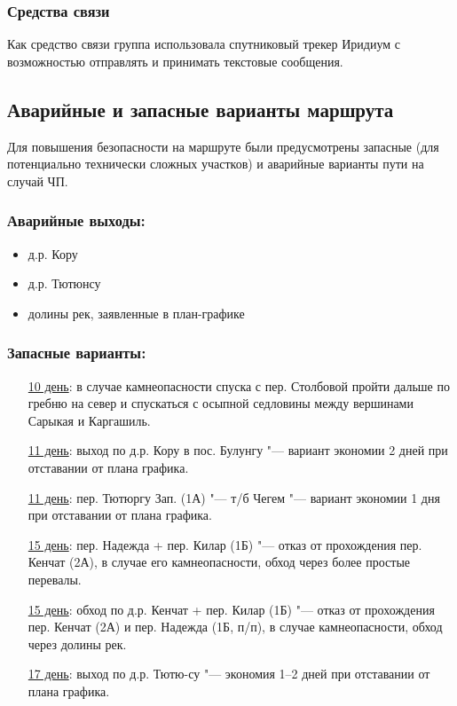 		\subsubsection{Средства связи}
			Как средство связи группа использовала спутниковый трекер Иридиум с возможностью отправлять и принимать текстовые сообщения. 

	\subsection{Аварийные и запасные варианты маршрута}
		Для повышения безопасности на маршруте были предусмотрены запасные (для потенциально технически сложных участков) и 
		аварийные варианты пути  на случай ЧП.

		\subsubsection*{Аварийные выходы:}
			\begin{itemize}
				\item д.р. Кору
				\item д.р. Тютюнсу
				\item долины рек, заявленные в план-графике
			\end{itemize}

		\subsubsection*{Запасные варианты:}
			\settowidth{\tmplen}{10 день: }
			\addtolength{\tmplen}{\leftmargin}
			\begin{enumerate}[leftmargin=\tmplen]
				\item[\uline{10 день}:] в случае камнеопасности спуска с пер. Столбовой пройти дальше по гребню на север и спускаться с осыпной седловины между вершинами Сарыкая и Каргашиль.
				\item[\uline{11 день}:] выход по д.р. Кору в пос. Булунгу "--- вариант экономии 2 дней при отставании от плана графика.
				\item[\uline{11 день}:] пер. Тютюргу Зап. (1А) "--- т/б Чегем "--- вариант экономии 1 дня при отставании от плана графика.
				\item[\uline{15 день}:] пер. Надежда + пер. Килар (1Б) "--- отказ от прохождения пер. Кенчат (2А), в случае его камнеопасности, обход через более простые перевалы.
				\item[\uline{15 день}:] обход по д.р. Кенчат + пер. Килар (1Б) "--- отказ от прохождения пер. Кенчат (2А) и пер. Надежда (1Б, п/п), в случае камнеопасности, обход через долины рек.
				\item[\uline{17 день}:] выход по д.р. Тютю-су "---  экономия 1--2 дней при отставании от плана графика.
			\end{enumerate}
		
